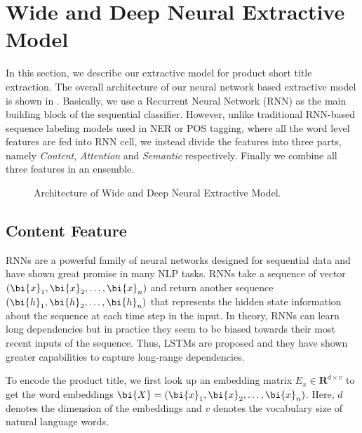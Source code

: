 \section{Wide and Deep Neural Extractive Model}
\label{sec:model}
In this section, we describe our extractive model for product short title extraction. 
The overall architecture of our neural network based extractive model is shown in .
Basically, we use a Recurrent Neural Network (RNN) as the main building block of the sequential classifier. 
However, unlike traditional RNN-based sequence labeling models used in NER or 
POS tagging, where all the word level features are fed into RNN cell, 
we instead divide the features into three parts, 
namely \emph{Content}, \emph{Attention} and \emph{Semantic} respectively. 
Finally we combine all three features in an ensemble.

\begin{figure*}[h]
	\centering
	\caption{Architecture of Wide and Deep Neural Extractive Model.}
	\label{fig:overview}
\end{figure*}

\subsection{Content Feature}
RNNs are a powerful family of neural networks designed for sequential data and 
have shown great promise in many NLP tasks. RNNs take a sequence of 
vector $(\bi{x}_1, \bi{x}_2, \dots, \bi{x}_n)$ and return another sequence 
$(\bi{h}_1, \bi{h}_2, \dots, \bi{h}_n)$ that represents the hidden state information 
about the sequence at each time step in the input. In theory, 
RNNs can learn long dependencies but in practice they seem to be biased towards 
their most recent inputs of the sequence. Thus, LSTMs \cite{hochreiter1997long} 
are proposed and they have shown greater capabilities to 
capture long-range dependencies.

To encode the product title, we first look up an embedding matrix $E_x\in \textbf{R}^{d\times v}$ to get the word embeddings $\bi{X}=(\bi{x}_1, \bi{x}_2, \dots, \bi{x}_n)$. 
Here, $d$ denotes the dimension of the embeddings and $v$ denotes the vocabulary size of natural language words. 

